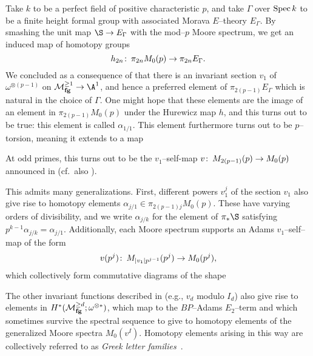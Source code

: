 \begin{example}
Take \(k\) to be a perfect field of positive characteristic \(p\), and take \(\Gamma\) over \(\operatorname{Spec} k\) to be a finite height formal group with associated Morava \(E\)--theory \(E_\Gamma\).  By smashing the unit map \(\S \to E_\Gamma\) with the mod--\(p\) Moore spectrum, we get an induced map of homotopy groups \[h_{2n}\colon\thinspace \pi_{2n} M_0(p) \to \pi_{2n} E_\Gamma.\]  We concluded as a consequence of  that there is an invariant section \(v_1\) of \(\omega^{\otimes(p-1)}\) on \(\moduli{fg}^{\ge 1} \to \A^1\), and hence a preferred element of \(\pi_{2(p-1)} E_\Gamma\) which is natural in the choice of \(\Gamma\).  One might hope that these elements are the image of an element in \(\pi_{2(p-1)} M_0(p)\) under the Hurewicz map \(h\), and this turns out to be true: this element is called \(\alpha_{1/1}\).  This element furthermore turns out to be \(p\)--torsion, meaning it extends to a map
\begin{center}
\end{center}
At odd primes, this turns out to be the \(v_1\)--self-map \(v\colon\thinspace M_{2(p-1)}(p) \to M_0(p)\) announced in  (cf.\ also \cite[Proposition 12.7]{AdamsJXIV}).

This admits many generalizations.  First, different powers \(v_1^j\) of the section \(v_1\) also give rise to homotopy elements \(\alpha_{j/1} \in \pi_{2(p-1)j} M_0(p)\).  These have varying orders of divisibility, and we write \(\alpha_{j/k}\) for the element of \(\pi_* \S\) satisfying \(p^{k-1} \alpha_{j/k} = \alpha_{j/1}\).  Additionally, each Moore spectrum supports an Adams \(v_1\)--self--map of the form \[v(p^j) \colon\thinspace M_{|v_1| p^{j-1}}(p^j) \to M_0(p^j),\] which collectively form commutative diagrams of the shape
\begin{center}
\end{center}
The other invariant functions described in  (e.g., \(v_d\) modulo \(I_d\)) also give rise to elements in \(H^*(\mathcal{M}_{\mathbf{fg}}^{\ge d}; \omega^{\otimes *})\), which map to the \(BP\)--Adams \(E_2\)--term and which sometimes survive the spectral sequence to give to homotopy elements of the generalized Moore spectra \(M_0(v^I)\).  Homotopy elements arising in this way are collectively referred to as \textit{Greek letter families}~\cite[Section 3]{MRW}.
\end{example}

